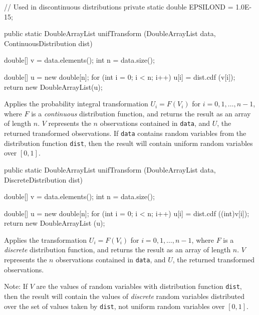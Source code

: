 \begin{code}\begin{hide}
   // Used in discontinuous distributions
   private static double EPSILOND = 1.0E-15;
\end{hide}

   public static DoubleArrayList unifTransform (DoubleArrayList data,
                                                ContinuousDistribution dist)\begin{hide} {
      double[] v = data.elements();
      int n = data.size();

      double[] u = new double[n];
      for (int i = 0; i < n; i++)
         u[i] = dist.cdf (v[i]);
      return new DoubleArrayList(u);
   }\end{hide}
\end{code}
\begin{tabb} Applies the probability integral transformation
  $U_i = F (V_i)$ for $i = 0, 1, \ldots, n-1$,
  where $F$ is a {\em continuous\/} distribution function,
  and returns the result as an array of length $n$.
  $V$ represents the $n$ observations contained in \texttt{data},
  and $U$, the returned transformed observations.
  If \texttt{data} contains random variables from the distribution function
  \texttt{dist}, then the result will contain uniform random variables
  over $[0,1]$.
\end{tabb}
\begin{htmlonly}
\end{htmlonly}
\begin{code}

   public static DoubleArrayList unifTransform (DoubleArrayList data,
                                                DiscreteDistribution dist)\begin{hide} {
       double[] v = data.elements();
       int n = data.size();

       double[] u = new double[n];
       for (int i = 0; i < n; i++)
          u[i] = dist.cdf ((int)v[i]);
       return new DoubleArrayList (u);
   }\end{hide}
\end{code}
\begin{tabb} Applies the transformation $U_i = F (V_i)$ for $i = 0, 1, \ldots, n-1$,
   where $F$ is a {\em discrete\/} distribution function,
   and returns the result as an array of length $n$.
  $V$ represents the $n$ observations contained in \texttt{data},
  and $U$, the returned transformed observations.

   Note: If $V$ are the values of random variables with
   distribution function \texttt{dist}, then the result will contain
   the values of {\em discrete\/} random variables distributed over the
   set of values taken by \texttt{dist},
   not uniform random variables over $[0,1]$.
\end{tabb}
